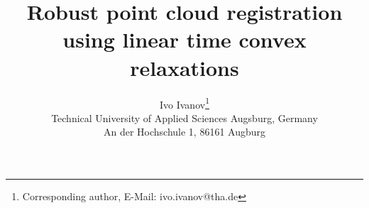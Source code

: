 \documentclass[10pt,twocolumn,letterpaper]{article}
\title{Robust point cloud registration using linear time convex relaxations}
\author{Ivo Ivanov\thanks{Corresponding author, E-Mail: ivo.ivanov@tha.de}\\
Technical University of Applied Sciences Augsburg, Germany\\
An der Hochschule 1, 86161 Augburg\\
}
\begin{document}
\maketitle
    



%

{
    \small
    
    
}


\end{document}
